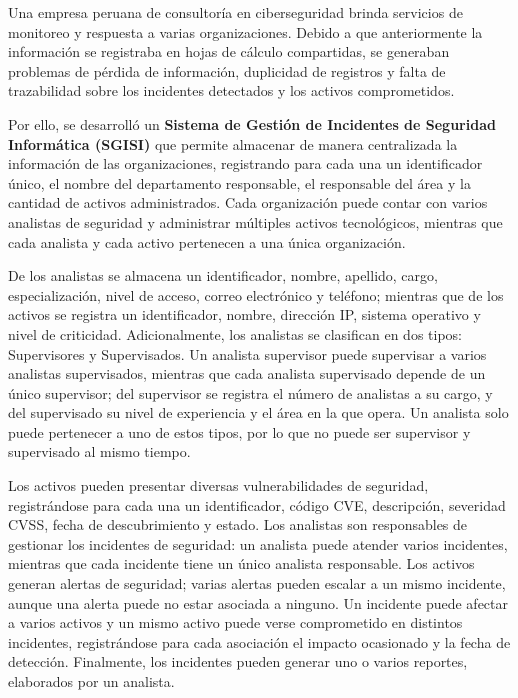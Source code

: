 \documentclass[11pt,a4paper]{article}
\begin{document}
Una empresa peruana de consultoría en ciberseguridad brinda servicios de monitoreo y
respuesta a varias organizaciones. Debido a que anteriormente la información se
registraba en hojas de cálculo compartidas, se generaban problemas de pérdida de
información, duplicidad de registros y falta de trazabilidad sobre los incidentes
detectados y los activos comprometidos.

Por ello, se desarrolló un \textbf{Sistema de Gestión de Incidentes de Seguridad
Informática (SGISI)} que permite almacenar de manera centralizada la información de
las organizaciones, registrando para cada una un identificador único, el nombre del
departamento responsable, el responsable del área y la cantidad de activos
administrados. Cada organización puede contar con varios analistas de seguridad y
administrar múltiples activos tecnológicos, mientras que cada analista y cada activo
pertenecen a una única organización.

De los analistas se almacena un identificador, nombre, apellido, cargo,
especialización, nivel de acceso, correo electrónico y teléfono; mientras que de los
activos se registra un identificador, nombre, dirección IP, sistema operativo y nivel
de criticidad. Adicionalmente, los analistas se clasifican en dos tipos: Supervisores
y Supervisados. Un analista supervisor puede supervisar a varios analistas
supervisados, mientras que cada analista supervisado depende de un único supervisor;
del supervisor se registra el número de analistas a su cargo, y del supervisado su
nivel de experiencia y el área en la que opera. Un analista solo puede pertenecer a
uno de estos tipos, por lo que no puede ser supervisor y supervisado al mismo tiempo.

Los activos pueden presentar diversas vulnerabilidades de seguridad, registrándose
para cada una un identificador, código CVE, descripción, severidad CVSS, fecha de
descubrimiento y estado. Los analistas son responsables de gestionar los incidentes de
seguridad: un analista puede atender varios incidentes, mientras que cada incidente
tiene un único analista responsable. Los activos generan alertas de seguridad; varias
alertas pueden escalar a un mismo incidente, aunque una alerta puede no estar asociada
a ninguno. Un incidente puede afectar a varios activos y un mismo activo puede verse
comprometido en distintos incidentes, registrándose para cada asociación el impacto
ocasionado y la fecha de detección. Finalmente, los incidentes pueden generar uno o
varios reportes, elaborados por un analista.
\end{document}
